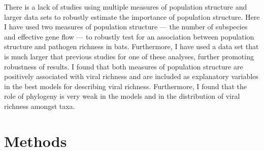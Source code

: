 
There is a lack of studies using multiple measures of population structure and larger data sets to robustly estimate the importance of population structure.
Here I have used two measures of population structure --- the number of subspecies and effective gene flow --- to robustly test for an association between population structure and pathogen richness in bats.
Furthermore, I have used a data set that is much larger that previous studies for one of these analyses, further promoting robustness of results.
I found that both measures of population structure are positively associated with viral richness and are included as explanatory variables in the best models for describing viral richness.
Furthermore, I found that the role of phylogeny is very weak in the models and in the distribution of viral richness amongst taxa.



\section{Methods}



















































































